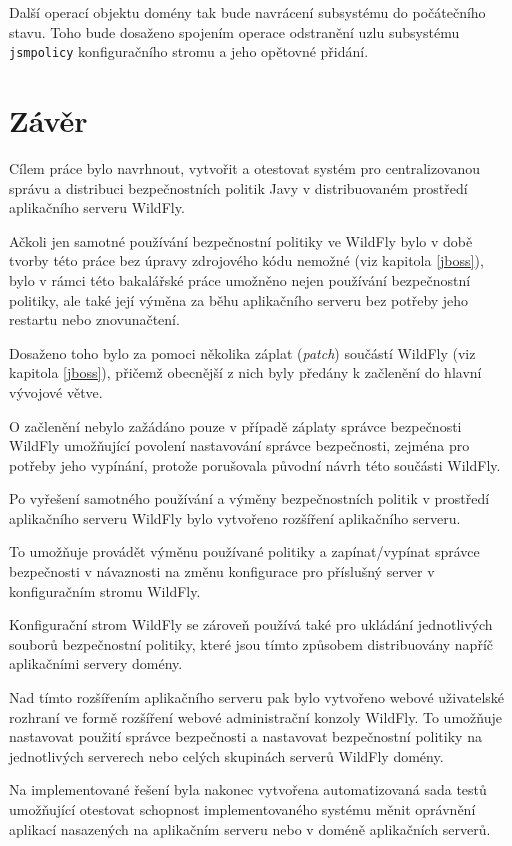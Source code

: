 Další operací objektu domény tak bude navrácení subsystému do počátečního stavu. Toho bude dosaženo spojením operace odstranění uzlu subsystému {\tt jsmpolicy} konfiguračního stromu a jeho opětovné přidání.

\chapter{Závěr}

Cílem práce bylo navrhnout, vytvořit a otestovat systém pro centralizovanou správu a distribuci bezpečnostních politik Javy v distribuovaném prostředí aplikačního serveru WildFly.

Ačkoli jen samotné používání bezpečnostní politiky ve WildFly bylo v době tvorby této práce bez úpravy zdrojového kódu nemožné (viz kapitola \ref{jboss}),
bylo v rámci této bakalářské práce umožněno nejen používání bezpečnostní politiky, ale také její výměna za běhu aplikačního serveru bez potřeby
jeho restartu nebo znovunačtení.

Dosaženo toho bylo za pomoci několika záplat ({\it patch}) součástí WildFly (viz kapitola \ref{jboss}), přičemž obecnější z nich byly předány
k začlenění do hlavní vývojové větve. \cite{smPullRequest}\cite{jbossModulesPullRequest}

O začlenění nebylo zažádáno pouze v případě záplaty správce bezpečnosti WildFly umožňující povolení nastavování správce bezpečnosti,
zejména pro potřeby jeho vypínání, protože porušovala původní návrh této součásti WildFly.

Po vyřešení samotného používání a výměny bezpečnostních politik v prostředí aplikačního serveru WildFly bylo vytvořeno rozšíření aplikačního serveru.

To umožňuje provádět výměnu používané politiky a zapínat/vypínat správce bezpečnosti v návaznosti na změnu konfigurace pro příslušný server
v konfiguračním stromu WildFly.

Konfigurační strom WildFly se zároveň používá také pro ukládání jednotlivých souborů bezpečnostní politiky, které jsou tímto způsobem distribuovány napříč aplikačními servery domény.

Nad tímto rozšířením aplikačního serveru pak bylo vytvořeno webové uživatelské rozhraní ve formě rozšíření webové administrační konzoly WildFly.
To umožňuje nastavovat použití správce bezpečnosti a nastavovat bezpečnostní politiky na jednotlivých serverech nebo celých skupinách serverů WildFly domény.

Na implementované řešení byla nakonec vytvořena automatizovaná sada testů umožňující otestovat schopnost implementovaného systému měnit oprávnění
aplikací nasazených na aplikačním serveru nebo v doméně aplikačních serverů.

